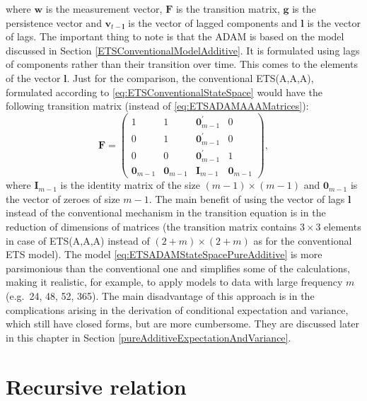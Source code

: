 \documentclass[]{book}
\theoremstyle{definition}
\theoremstyle{definition}
\theoremstyle{definition}
\theoremstyle{definition}
\theoremstyle{remark}
\begin{document}
where \(\mathbf{w}\) is the measurement vector, \(\mathbf{F}\) is the transition matrix, \(\mathbf{g}\) is the persistence vector and \(\mathbf{v}_{t-\mathbf{l}}\) is the vector of lagged components and \(\mathbf{l}\) is the vector of lags. The important thing to note is that the ADAM is based on the model discussed in Section \ref{ETSConventionalModelAdditive}. It is formulated using lags of components rather than their transition over time. This comes to the elements of the vector \(\mathbf{l}\). Just for the comparison, the conventional ETS(A,A,A), formulated according to \eqref{eq:ETSConventionalStateSpace} would have the following transition matrix (instead of \eqref{eq:ETSADAMAAAMatrices}):
\begin{equation}
  \mathbf{F} = \begin{pmatrix} 1 & 1 & \mathbf{0}^\prime_{m-1} & 0 \\ 0 & 1 & \mathbf{0}^\prime_{m-1} & 0 \\ 0 & 0 & \mathbf{0}^\prime_{m-1} & 1 \\ \mathbf{0}_{m-1} & \mathbf{0}_{m-1} & \mathbf{I}_{m-1} & \mathbf{0}_{m-1} \end{pmatrix},
  \label{eq:ETSADAMAAAMatricesTransition}
\end{equation}
where \(\mathbf{I}_{m-1}\) is the identity matrix of the size \((m-1) \times (m-1)\) and \(\mathbf{0}_{m-1}\) is the vector of zeroes of size \(m-1\). The main benefit of using the vector of lags \(\mathbf{l}\) instead of the conventional mechanism in the transition equation is in the reduction of dimensions of matrices (the transition matrix contains \(3\times 3\) elements in case of ETS(A,A,A) instead of \((2+m)\times (2+m)\) as for the conventional ETS model). The model \eqref{eq:ETSADAMStateSpacePureAdditive} is more parsimonious than the conventional one and simplifies some of the calculations, making it realistic, for example, to apply models to data with large frequency \(m\) (e.g.~24, 48, 52, 365). The main disadvantage of this approach is in the complications arising in the derivation of conditional expectation and variance, which still have closed forms, but are more cumbersome. They are discussed later in this chapter in Section \ref{pureAdditiveExpectationAndVariance}.

\hypertarget{adamETSPureAdditiveRecursive}{%
\section{Recursive relation}\label{adamETSPureAdditiveRecursive}}
\end{document}
